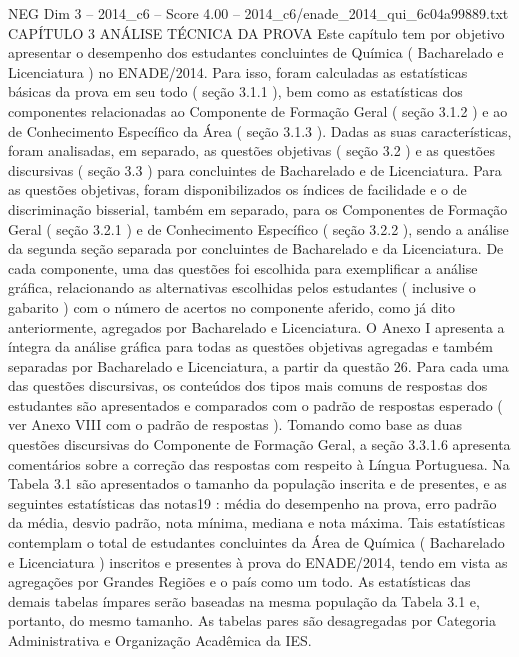 \begin{textsample}{NEG Dim 3 – 2014\_c6 – Score 4.00 – 2014\_c6/enade\_2014\_qui\_6c04a99889.txt}  \label{ex:f3_neg_251}
CAPÍTULO 3 ANÁLISE TÉCNICA DA PROVA Este capítulo tem por objetivo apresentar o desempenho dos estudantes concluintes de Química ( Bacharelado e Licenciatura ) no ENADE/2014.
Para isso, foram calculadas as estatísticas básicas da prova em seu todo ( seção 3.1.1 ), bem como as estatísticas dos componentes relacionadas ao Componente de Formação Geral ( seção 3.1.2 ) e ao de Conhecimento Específico da Área ( seção 3.1.3 ).
Dadas as suas características, foram analisadas, em separado, as questões objetivas ( seção 3.2 ) e as questões discursivas ( seção 3.3 ) para concluintes de Bacharelado e de Licenciatura.
Para as questões objetivas, foram disponibilizados os índices de facilidade e o de discriminação bisserial, também em separado, para os Componentes de Formação Geral ( seção 3.2.1 ) e de Conhecimento Específico ( seção 3.2.2 ), sendo a análise da segunda seção separada por concluintes de Bacharelado e da Licenciatura.
De cada componente, uma das questões foi escolhida para exemplificar a análise gráfica, relacionando as alternativas escolhidas pelos estudantes ( inclusive o gabarito ) com o número de acertos no componente aferido, como já dito anteriormente, agregados por Bacharelado e Licenciatura.
O Anexo I apresenta a íntegra da análise gráfica para todas as questões objetivas agregadas e também separadas por Bacharelado e Licenciatura, a partir da questão 26.
Para cada uma das questões discursivas, os conteúdos dos tipos mais comuns de respostas dos estudantes são apresentados e comparados com o padrão de respostas esperado ( ver Anexo VIII com o padrão de respostas ).
Tomando como base as duas questões discursivas do Componente de Formação Geral, a seção 3.3.1.6 apresenta comentários sobre a correção das respostas com respeito à Língua Portuguesa.
Na Tabela 3.1 são apresentados o tamanho da população inscrita e de presentes, e as seguintes estatísticas das notas19 : média do desempenho na prova, erro padrão da média, desvio padrão, nota mínima, mediana e nota máxima.
Tais estatísticas contemplam o total de estudantes concluintes da Área de Química ( Bacharelado e Licenciatura ) inscritos e presentes à prova do ENADE/2014, tendo em vista as agregações por Grandes Regiões e o país como um todo.
As estatísticas das demais tabelas ímpares serão baseadas na mesma população da Tabela 3.1 e, portanto, do mesmo tamanho.
As tabelas pares são desagregadas por Categoria Administrativa e Organização Acadêmica da IES.

\end{textsample}
